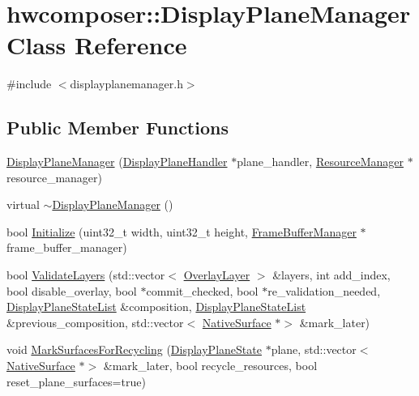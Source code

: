 \hypertarget{classhwcomposer_1_1DisplayPlaneManager}{}\section{hwcomposer\+:\+:Display\+Plane\+Manager Class Reference}
\label{classhwcomposer_1_1DisplayPlaneManager}


{\ttfamily \#include $<$displayplanemanager.\+h$>$}

\subsection*{Public Member Functions}
\begin{DoxyCompactItemize}
\item 
\mbox{\hyperlink{classhwcomposer_1_1DisplayPlaneManager_ad14eef5182a0ca73ed585de5db43b9f7}{Display\+Plane\+Manager}} (\mbox{\hyperlink{classhwcomposer_1_1DisplayPlaneHandler}{Display\+Plane\+Handler}} $\ast$plane\+\_\+handler, \mbox{\hyperlink{classhwcomposer_1_1ResourceManager}{Resource\+Manager}} $\ast$resource\+\_\+manager)
\item 
virtual \mbox{\hyperlink{classhwcomposer_1_1DisplayPlaneManager_a897ab790611539e024ecdd1497b7d579}{$\sim$\+Display\+Plane\+Manager}} ()
\item 
bool \mbox{\hyperlink{classhwcomposer_1_1DisplayPlaneManager_ab1d0c1f3132a46d2ab2ba323a418eebf}{Initialize}} (uint32\+\_\+t width, uint32\+\_\+t height, \mbox{\hyperlink{classhwcomposer_1_1FrameBufferManager}{Frame\+Buffer\+Manager}} $\ast$frame\+\_\+buffer\+\_\+manager)
\item 
bool \mbox{\hyperlink{classhwcomposer_1_1DisplayPlaneManager_ab619680feec679f90c733f104bab43d4}{Validate\+Layers}} (std\+::vector$<$ \mbox{\hyperlink{structhwcomposer_1_1OverlayLayer}{Overlay\+Layer}} $>$ \&layers, int add\+\_\+index, bool disable\+\_\+overlay, bool $\ast$commit\+\_\+checked, bool $\ast$re\+\_\+validation\+\_\+needed, \mbox{\hyperlink{namespacehwcomposer_adf383ae435d39a5631a8ad82e7fa18a4}{Display\+Plane\+State\+List}} \&composition, \mbox{\hyperlink{namespacehwcomposer_adf383ae435d39a5631a8ad82e7fa18a4}{Display\+Plane\+State\+List}} \&previous\+\_\+composition, std\+::vector$<$ \mbox{\hyperlink{classhwcomposer_1_1NativeSurface}{Native\+Surface}} $\ast$$>$ \&mark\+\_\+later)
\item 
void \mbox{\hyperlink{classhwcomposer_1_1DisplayPlaneManager_adafd342e7e70017f40491d6ba3e70360}{Mark\+Surfaces\+For\+Recycling}} (\mbox{\hyperlink{classhwcomposer_1_1DisplayPlaneState}{Display\+Plane\+State}} $\ast$plane, std\+::vector$<$ \mbox{\hyperlink{classhwcomposer_1_1NativeSurface}{Native\+Surface}} $\ast$$>$ \&mark\+\_\+later, bool recycle\+\_\+resources, bool reset\+\_\+plane\+\_\+surfaces=true)

\end{DoxyCompactItemize}
